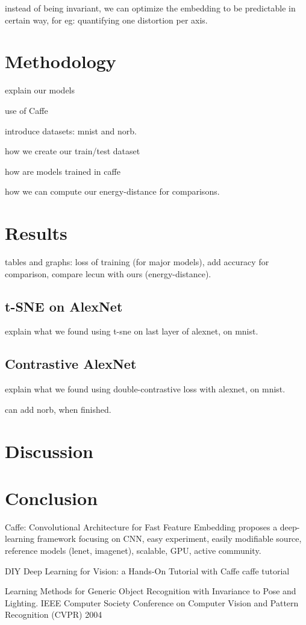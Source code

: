 \documentclass[a4paper,12pt]{report}
\begin{document}
instead of being invariant, we can optimize the embedding to be predictable in certain way, for eg: quantifying one distortion per axis.

\chapter{Methodology}

explain our models

use of Caffe

introduce datasets: mnist and norb.

how we create our train/test dataset

how are models trained in caffe

how we can compute our energy-distance for comparisons.

\chapter{Results}

tables and graphs: loss of training (for major models), add accuracy for comparison, compare lecun with ours (energy-distance).

\section{t-SNE on AlexNet}
explain what we found using t-sne on last layer of alexnet, on mnist.

\section{Contrastive AlexNet}
explain what we found using double-contrastive loss with alexnet, on mnist.

can add norb, when finished.

\chapter{Discussion}

\chapter{Conclusion}


Caffe: Convolutional Architecture for Fast Feature Embedding
proposes a deep-learning framework focusing on CNN, easy experiment, easily modifiable source, reference models (lenet, imagenet), scalable, GPU, active community.

DIY Deep Learning for Vision: a Hands-On Tutorial with Caffe
caffe tutorial

Learning Methods for Generic Object Recognition with Invariance to Pose and Lighting. IEEE Computer Society Conference on Computer Vision and Pattern Recognition (CVPR) 2004
\end{document}
